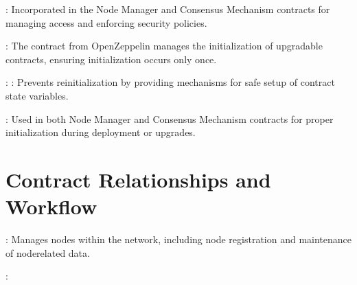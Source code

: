 \documentclass[a4paper,10pt,english]{sphinxmanual}
\begin{document}
\sphinxAtStartPar
{}:
Incorporated in the Node Manager and Consensus Mechanism contracts for managing access and enforcing security policies.

\sphinxAtStartPar
{}

\sphinxAtStartPar
{}:
The  contract from OpenZeppelin manages the initialization of upgradable contracts, ensuring initialization occurs only once.

\sphinxAtStartPar
{}:
\sphinxhyphen{} : Prevents reinitialization by providing mechanisms for safe setup of contract state variables.

\sphinxAtStartPar
{}:
Used in both Node Manager and Consensus Mechanism contracts for proper initialization during deployment or upgrades.


\section{Contract Relationships and Workflow}
\label{\detokenize{docs_upgradable_contract:contract-relationships-and-workflow}}
\sphinxAtStartPar
{}

\sphinxAtStartPar
{}:
Manages nodes within the network, including node registration and maintenance of node\sphinxhyphen{}related data.

\sphinxAtStartPar
{}:
\end{document}
